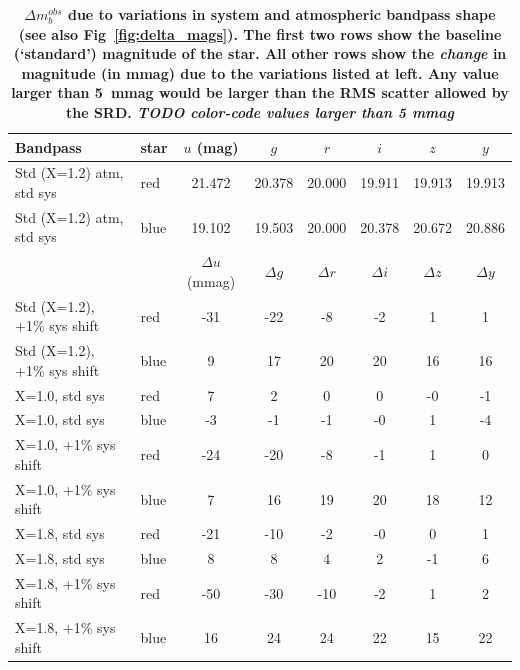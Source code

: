 \documentclass[12pt,preprint]{aastex}
\begin{document}
\begin{center}
\begin{table}[htb]
\caption{{\bf $\Delta m_b^{obs}$ due to variations in system and atmospheric
 bandpass shape (see also Fig~\ref{fig:delta_mags}). The first two
rows show the baseline (`standard') magnitude of the star. All other rows show the 
{\it change} in magnitude (in mmag) due to the variations listed at
left. Any value larger than 5~mmag would be larger than the RMS
scatter allowed by the SRD. {\it TODO color-code values larger than 5 mmag}} }
\begin{tabular}{l l | c c c c c c}
Bandpass & star &  $u$ (mag) & $g$ & $r$ & $i$ & $z$ & $y$ \\ \hline
Std (X=1.2) atm, std sys  &  red & 21.472 & 20.378 & 20.000 & 19.911 & 19.913 & 19.913 \\
Std (X=1.2) atm, std sys  &  blue & 19.102 & 19.503 & 20.000 & 20.378 & 20.672 & 20.886 \\ \hline \hline
 & & $\Delta u$ (mmag) & $\Delta g$  & $\Delta r$  & $\Delta i$ & $\Delta z$  & $\Delta y$ \\ \hline
Std (X=1.2), +1\% sys shift & red  & -31 & -22 & -8 & -2 & 1 & 1 \\
Std (X=1.2), +1\% sys shift & blue  & 9 & 17 & 20 & 20 & 16 & 16 \\ \hline
X=1.0, std sys & red  & 7 & 2 & 0 & 0 & -0 & -1 \\
X=1.0, std sys & blue  & -3 & -1 & -1 & -0 & 1 & -4 \\ \hline
X=1.0, +1\% sys shift & red & -24 & -20 & -8 & -1 & 1 & 0 \\
X=1.0, +1\% sys shift & blue & 7 & 16 & 19 & 20 & 18 & 12 \\ \hline
X=1.8, std sys  & red & -21 & -10 & -2 & -0 & 0 & 1 \\
X=1.8, std sys  & blue & 8 & 8 & 4 & 2 & -1 & 6 \\ \hline
X=1.8, +1\% sys shift & red & -50 & -30 & -10 & -2 & 1 & 2 \\
X=1.8, +1\% sys shift & blue & 16 & 24 & 24 & 22 & 15 & 22 \\ \hline
\end{tabular}
\label{tab:delta_mags}
\end{table}
\end{center}
\end{document}
